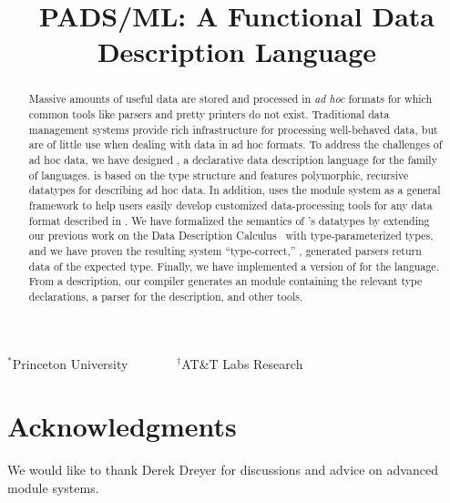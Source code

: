 \documentclass[nocopyrightspace]{sigplanconf}
\begin{document}
\title{PADS/ML: A Functional Data Description Language}
{$^\ast$Princeton University \ \ \ \ \ \ \ $^\dagger$AT\&T Labs Research}
 { \ \ \ \ }



\maketitle{}

\begin{abstract}  

  Massive amounts of useful data are stored and processed in
  \textit{ad hoc} formats for which common tools like parsers and
  pretty printers do not exist.  Traditional data management 
  systems provide rich infrastructure for processing well-behaved
  data, but are of little use when dealing with data in ad hoc
  formats.  To address the challenges of ad hoc data, we have designed
  \padsml{}, a declarative data description language for the \ml{} family
  of languages.  \padsml{} is based on the \ml{} type structure and
  features polymorphic, recursive datatypes for describing ad hoc
  data.  In addition, \padsml{} uses the \ml{} module system as a general
  framework to help users easily develop customized data-processing
  tools for any data format described in \padsml{}.  We have formalized the
  semantics of \padsml{}'s datatypes by extending our previous work on
  the Data Description Calculus~\cite{fisher+:next700ddl} with
  type-parameterized types, and we have proven the resulting system
  ``type-correct,'' \ie{}, generated parsers return data of the
  expected type.  Finally, we have implemented a version of \padsml{}
  for the \ocaml{} language.  From a \padsml{} description, our compiler
  generates an \ocaml{} module containing the relevant type
  declarations, a parser for the description, and other tools.

\end{abstract}















\section*{Acknowledgments}

We would like to thank Derek Dreyer for discussions and advice on
advanced module systems.



%


\end{document}
